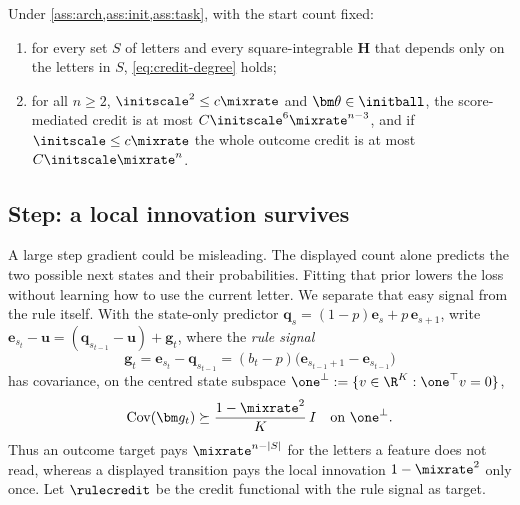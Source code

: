 \begin{theorem}
\label{thm:main}
Under \cref{ass:arch,ass:init,ass:task}, with the start count fixed:
\begin{enumerate}[label=(\roman*),leftmargin=*,itemsep=0pt,topsep=2pt]
\item for every set $S$ of letters and every square-integrable $\mathbf H$ that depends only on the letters in $S$, \cref{eq:credit-degree} holds;
\item for all $n\ge2$, $\initscale^2\le c\mixrate$ and $\bm\theta\in\initball$, the score-mediated credit is at most $C\initscale^6\mixrate^{n-3}$, and if
$\initscale\le c\mixrate$ the whole outcome credit is at most $C\initscale\mixrate^n$.
\end{enumerate}
\end{theorem}

\subsection{Step: a local innovation survives}
A large step gradient could be misleading. The displayed count alone predicts the two possible next states and their probabilities.
Fitting that prior lowers the loss without learning how to use the current letter. We separate that easy signal from the rule itself. With the
state-only predictor $\bm q_s=(1-p)\bm e_s+p\,\bm e_{s+1}$, write $\bm e_{s_t}-\bm u=(\bm q_{s_{t-1}}-\bm u)+\bm g_t$, where the
\emph{rule signal}
\[
 \bm g_t=\bm e_{s_t}-\bm q_{s_{t-1}}=(b_t-p)\bigl(\bm e_{s_{t-1}+1}-\bm e_{s_{t-1}}\bigr)
\]
has covariance, on the centred state subspace $\one^\perp:=\{v\in\R^K:\one^\top v=0\}$,
\begin{equation}
 \operatorname{Cov}(\bm g_t)\succeq\frac{1-\mixrate^2}{K}\,I
 \quad\text{on }\one^\perp.
 \label{eq:local-variation}
\end{equation}
Thus an outcome target pays $\mixrate^{n-|S|}$ for the letters a feature does not read, whereas a displayed transition pays the
local innovation $1-\mixrate^2$ only once. Let $\rulecredit$ be the credit
functional with the rule signal as target.

